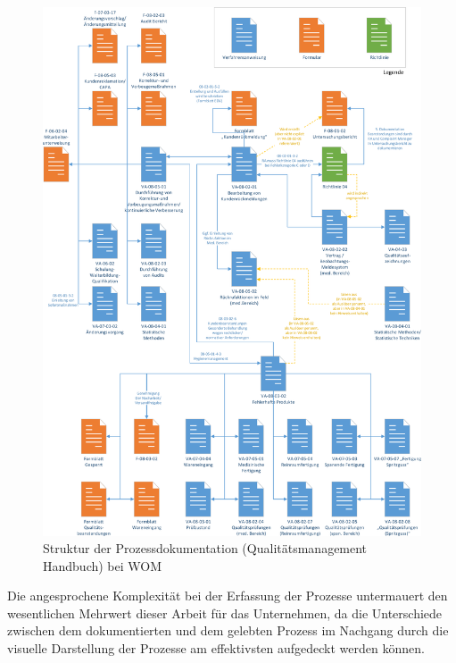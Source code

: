 \documentclass[a4paper,12pt]{report}
\begin{document}
\begin{figure}[ht]
\centering
\includegraphics[height=0.9\textheight]{Images/DokumentenstrukturWOM}
\caption[Struktur der Prozessdokumentation (Qualitätsmanagement Handbuch) bei WOM]{Struktur der Prozessdokumentation (Qualitätsmanagement Handbuch) bei WOM}
\label{struktur_dokumente}
\end{figure}

Die angesprochene Komplexität bei der Erfassung der Prozesse untermauert den wesentlichen Mehrwert dieser Arbeit für das Unternehmen, da die Unterschiede zwischen dem dokumentierten und dem gelebten Prozess im Nachgang durch die visuelle Darstellung der Prozesse am effektivsten aufgedeckt werden können.
\end{document}
